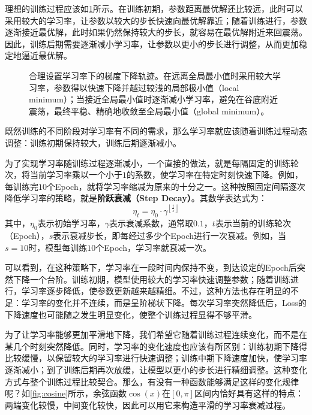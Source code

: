 理想的训练过程应该如\cref{fig:learning_rate_good}所示。在训练初期，参数距离最优解还比较远，此时可以采用较大的学习率，让参数以较大的步长快速向最优解靠近；随着训练进行，参数逐渐接近最优解，此时如果仍然保持较大的步长，就容易在最优解附近来回震荡。因此，训练后期需要逐渐减小学习率，让参数以更小的步长进行调整，从而更加稳定地逼近最优解。

\begin{figure}[H]
    \caption{合理设置学习率下的梯度下降轨迹。在远离全局最小值时采用较大学习率，参数得以快速下降并越过较浅的局部极小值（local minimum）；当接近全局最小值时逐渐减小学习率，避免在谷底附近震荡，最终平稳、精确地收敛至全局最小值（global minimum）。}
    \label{fig:learning_rate_good}
\end{figure}

既然训练的不同阶段对学习率有不同的需求，那么学习率就应该随着训练过程动态调整：训练初期保持较大，训练后期逐渐减小。

为了实现学习率随训练过程逐渐减小，一个直接的做法，就是每隔固定的训练轮次，将当前学习率乘以一个小于$1$的系数，使学习率在特定时刻快速下降。例如，每训练完$10$个Epoch，就将学习率缩减为原来的十分之一。这种按照固定间隔逐次降低学习率的策略，就是\textbf{阶跃衰减（Step Decay）}。其数学表达式为：
$$
\eta_t = \eta_0 \cdot \gamma^{\left\lfloor \frac{t}{s} \right\rfloor}
$$
其中，$\eta_0$表示初始学习率，$\gamma$表示衰减系数，通常取$0.1$，$t$表示当前的训练轮次（Epoch），$s$表示衰减步长，即每经过多少个Epoch进行一次衰减。例如，当$s=10$时，模型每训练$10$个Epoch，学习率就衰减一次。

可以看到，在这种策略下，学习率在一段时间内保持不变，到达设定的Epoch后突然下降一个台阶。训练初期，模型使用较大的学习率快速调整参数；随着训练进行，学习率逐步降低，使参数更新越来越精细。不过，这种方法也存在明显的不足：学习率的变化并不连续，而是呈阶梯状下降。每次学习率突然降低后，Loss的下降速度也可能随之发生明显变化，使整个训练过程显得不够平滑。

为了让学习率能够更加平滑地下降，我们希望它随着训练过程连续变化，而不是在某几个时刻突然降低。同时，学习率的变化速度也应该有所区别：训练初期下降得比较缓慢，以保留较大的学习率进行快速调整；训练中期下降速度加快，使学习率逐渐减小；到了训练后期再次放缓，让模型以更小的步长进行精细调整。这种变化方式与整个训练过程比较契合。那么，有没有一种函数能够满足这样的变化规律呢？如\cref{fig:cosine}所示，余弦函数$\cos(x)$在$[0,\pi]$区间内恰好具有这样的特点：两端变化较慢，中间变化较快，因此可以用它来构造平滑的学习率衰减过程。

